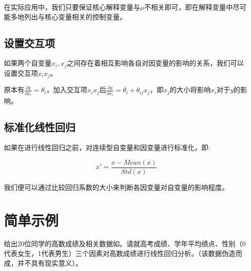 \documentclass[withoutpreface]{cumcmthesis}
\begin{document}
在实际应用中，我们只要保证核心解释变量与$\mu$不相关即可，即在解释变量中尽可能多地列出与核心变量相关的控制变量。

\subsection{设置交互项}

如果两个自变量$x_i,x_j$之间存在着相互影响各自对因变量的影响的关系，我们可以设置交互项$x_ix_j$。

原本有$\frac{\partial y}{\partial x_i}=\theta_i$，加入交互项$x_ix_j$后$\frac{\partial y}{\partial x_i} = \theta_i+\theta_{ij}x_j$，即$x_j$的大小将影响$x_i$对于$y$的影响。

\subsection{标准化线性回归}

如果在进行线性回归之前，对连续型自变量和因变量进行标准化，即:

\begin{equation}
  x' = \frac{x-Mean(x)}{Std(x)}
\end{equation}

我们便可以通过比较回归系数的大小来判断各因变量对自变量的影响程度。

\section{简单示例}

给出20位同学的高数成绩及相关数据如。请就高考成绩、学年平均绩点、性别（0代表女生，1代表男生）三个因素对高数成绩进行线性回归分析。（该数据伪造而成，并不具有现实意义）。
\end{document}
